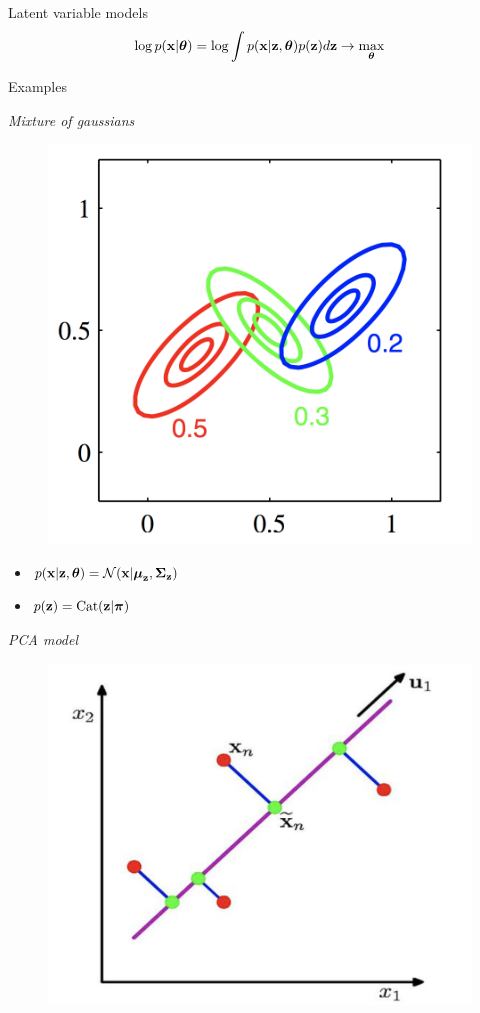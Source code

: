 \begin{frame}{Latent variable models}
    \[
    \log p(\mathbf{x} | \boldsymbol{\theta}) = \log \int p(\mathbf{x} | \mathbf{z}, \boldsymbol{\theta}) p(\mathbf{z}) d\mathbf{z} \rightarrow \max_{\boldsymbol{\theta}}
    \]
    \vspace{-0.6cm}
    \begin{block}{Examples}
    \begin{minipage}[t]{0.45\columnwidth}
		\textit{Mixture of gaussians} \\
		\vspace{-0.5cm}
		\begin{figure}
			\centering
			\includegraphics[width=0.75\linewidth]{figs/mixture_of_gaussians.png}
		\end{figure}
		\vspace{-0.5cm}
	    \begin{itemize}
	        \item $p(\mathbf{x} | \mathbf{z}, \boldsymbol{\theta}) = \mathcal{N}(\mathbf{x} | \boldsymbol{\mu}_{\mathbf{z}}, \boldsymbol{\Sigma}_{\mathbf{z}})$
	        \item $p(\mathbf{z}) = \text{Cat}(\mathbf{z} | \boldsymbol{\pi})$
	    \end{itemize}
	\end{minipage}%
	\begin{minipage}[t]{0.53\columnwidth}
		\textit{PCA model} \\
		\vspace{-0.5cm}
		\begin{figure}
			\centering
			\includegraphics[width=.7\linewidth]{figs/pca.png}

\end{figure}
\end{minipage}
\end{block}
\end{frame}

